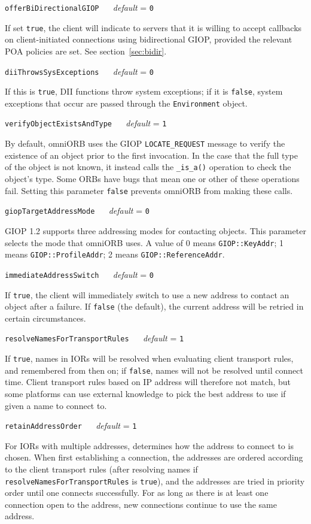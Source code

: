 \documentclass[11pt,oneside,a4paper]{book}
\makeatletter
\newcommand{\type}[1]{\texttt{#1}}
\newcommand{\code}[1]{\texttt{#1}}
\newcommand{\op}[1]{\texttt{#1()}}
\newcommand{\confopt}[2]
  {\vspace{\baselineskip}\par\noindent\code{#1} ~~ \textit{default} =
   \code{#2}}
\renewcommand{\confopt}[2]
  {\vspace{\baselineskip}\par\noindent\code{#1} ~~ \textit{default} =
   \code{#2}\\[-1ex]\@afterheading}
\newcommand{\dsc}{\discretionary{}{}{}}
\makeatother
\begin{document}
\confopt{offerBiDirectionalGIOP}{0}

If set \code{true}, the client will indicate to servers that it is
willing to accept callbacks on client-initiated connections using
bidirectional GIOP, provided the relevant POA policies are set. See
section~\ref{sec:bidir}.


\confopt{diiThrowsSysExceptions}{0}

If this is \code{true}, DII functions throw system exceptions; if it
is \code{false}, system exceptions that occur are passed through the
\type{Environment} object.


\confopt{verifyObjectExistsAndType}{1}

By default, omniORB uses the GIOP \code{LOCATE\_REQUEST} message to
verify the existence of an object prior to the first invocation. In
the case that the full type of the object is not known, it instead
calls the \op{\_is\_a} operation to check the object's type. Some ORBs
have bugs that mean one or other of these operations fail. Setting
this parameter \code{false} prevents omniORB from making these calls.


\confopt{giopTargetAddressMode}{0}

GIOP 1.2 supports three addressing modes for contacting objects. This
parameter selects the mode that omniORB uses. A value of 0 means
\code{GIOP::KeyAddr}; 1 means \code{GIOP::ProfileAddr}; 2 means
\code{GIOP::ReferenceAddr}.


\confopt{immediateAddressSwitch}{0}

If \code{true}, the client will immediately switch to use a new
address to contact an object after a failure. If \code{false} (the
default), the current address will be retried in certain
circumstances.

\confopt{resolveNamesForTransportRules}{1}

If \code{true}, names in IORs will be resolved when evaluating client
transport rules, and remembered from then on; if \code{false}, names
will not be resolved until connect time. Client transport rules based
on IP address will therefore not match, but some platforms can use
external knowledge to pick the best address to use if given a name to
connect to.

\confopt{retainAddressOrder}{1}

For IORs with multiple addresses, determines how the address to
connect to is chosen. When first establishing a connection, the
addresses are ordered according to the client transport rules (after
resolving names if \code{resolveNamesFor\dsc{}TransportRules} is
\code{true}), and the addresses are tried in priority order until one
connects successfully. For as long as there is at least one connection
open to the address, new connections continue to use the same address.
\end{document}
